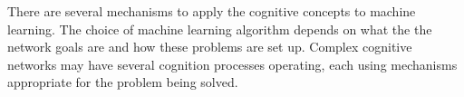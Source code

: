 There are several mechanisms to apply the cognitive concepts to machine learning. The choice of machine learning algorithm depends on what the the network goals are and how these problems are set up. Complex cognitive networks may have several cognition processes operating, each using mechanisms appropriate for the problem being solved.




